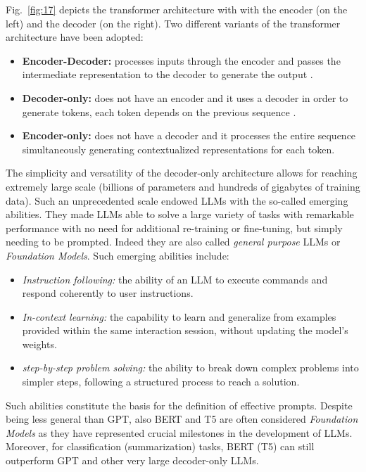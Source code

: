 Fig.~\ref{fig:17} depicts the transformer architecture with with the encoder (on the left) and the decoder (on the right).
Two different variants of the transformer architecture have been adopted:
\begin{itemize}
    \item \textbf{Encoder-Decoder:} processes inputs through the encoder and passes the intermediate representation to the decoder to generate the output \cite{encoder_medium}.

    \item \textbf{Decoder-only:} does not have an encoder and it uses a decoder in order to generate tokens, each token depends on the previous sequence \cite{uniteai_decoder}.

    \item \textbf{Encoder-only:} does not have a decoder and it processes the entire sequence simultaneously generating contextualized representations for each token\cite{ewer2024entp}.
\end{itemize}

The simplicity and versatility of the decoder-only architecture allows for reaching extremely large scale (billions of parameters and hundreds of gigabytes of training data).
Such an unprecedented scale endowed LLMs with the so-called emerging abilities.
They made LLMs able to solve a large variety of tasks with remarkable performance with no need for additional re-training or fine-tuning, but simply needing to be prompted.
Indeed they are also called \textit{general purpose} LLMs or \textit{Foundation Models}.
Such emerging abilities include:
\begin{itemize}
    \item \textit{Instruction following:} the ability of an LLM to execute commands and respond coherently to user instructions.

    \item \textit{In-context learning:} the capability to learn and generalize from examples provided within the same interaction session, without updating the model’s weights.

    \item \textit{step-by-step problem solving:} the ability to break down complex problems into simpler steps, following a structured process to reach a solution.
\end{itemize}
Such abilities constitute the basis for the definition of effective prompts.
Despite being less general than GPT, also BERT and T5 are often considered \textit{Foundation Models} as they have represented crucial milestones in the development of LLMs.
Moreover, for classification (summarization) tasks, BERT (T5) can still outperform GPT and other very large decoder-only LLMs.

